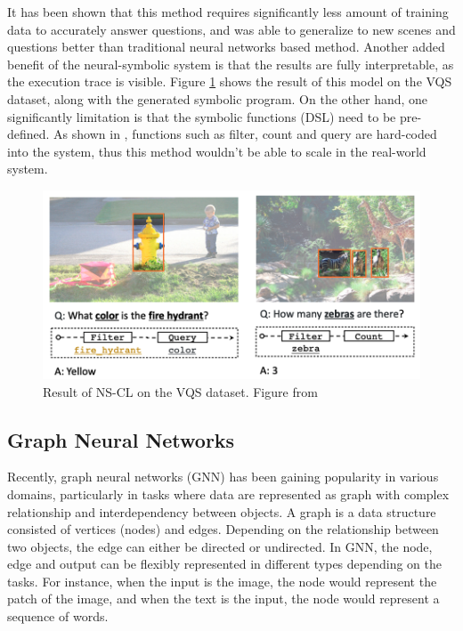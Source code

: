 \documentclass[journal]{IEEEtran}
\begin{document}
It has been shown that this method requires significantly less amount of training data to accurately answer questions, 
and was able to generalize to new scenes and questions better than traditional neural networks based method. 
Another added benefit of the neural-symbolic system is that the results are fully interpretable, as the execution trace is visible.
Figure \ref{nscl} shows the result of this model on the VQS dataset, along with the generated symbolic program. 
On the other hand, one significantly limitation is that the symbolic functions (DSL) need to be pre-defined. 
As shown in \cite{Mao2019NeuroSymbolic}, functions such as filter, count and query are hard-coded into the system, 
thus this method wouldn't be able to scale in the real-world system.

\begin{figure}[htb]
  \includegraphics[width=\linewidth]{nscl.png}
  \caption{Result of NS-CL on the VQS dataset. Figure from \cite{Mao2019NeuroSymbolic}}
  \label{nscl}
\end{figure}

\subsection{Graph Neural Networks}

Recently, graph neural networks (GNN) has been gaining popularity in various domains, 
particularly in tasks where data are represented as graph with complex relationship and interdependency between objects.
A graph is a data structure consisted of vertices (nodes) and edges.
Depending on the relationship between two objects, the edge can either be directed or undirected. 
In GNN, the node, edge and output can be flexibly represented in different types depending on the tasks. 
For instance, when the input is the image, the node would represent the patch of the image, and
when the text is the input, the node would represent a sequence of words.
\end{document}
